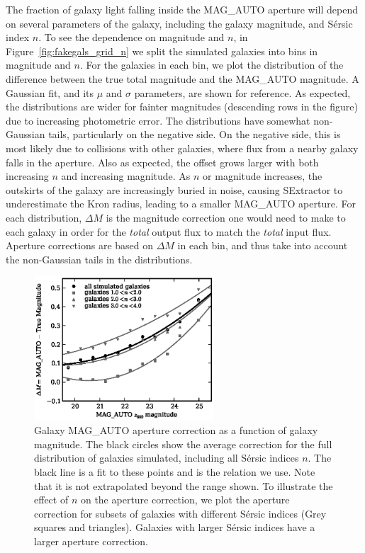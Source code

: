 The fraction of galaxy light falling inside the MAG\_AUTO aperture
will depend on several parameters of the galaxy, including the galaxy
magnitude, and S{\'e}rsic index $n$. To see the dependence on
magnitude and $n$, in Figure~\ref{fig:fakegals_grid_n} we split the
simulated galaxies into bins in magnitude and $n$. For the galaxies in
each bin, we plot the distribution of the difference between the true
total magnitude and the MAG\_AUTO magnitude.  A Gaussian fit, and its
$\mu$ and $\sigma$ parameters, are shown for reference. As expected,
the distributions are wider for fainter magnitudes (descending rows in
the figure) due to increasing photometric error. The distributions
have somewhat non-Gaussian tails, particularly on the negative side. On
the negative side, this is most likely due to collisions with other
galaxies, where flux from a nearby galaxy falls in the aperture. Also
as expected, the offset grows larger with both increasing $n$ and
increasing magnitude. As $n$ or magnitude increases, the outskirts of
the galaxy are increasingly buried in noise, causing {\sc SExtractor}
to underestimate the Kron radius, leading to a smaller MAG\_AUTO
aperture.  For each distribution, $\Delta M$ is the magnitude
correction one would need to make to each galaxy in order for
the \emph{total} output flux to match the \emph{total} input
flux. Aperture corrections are based on $\Delta M$ in each bin, and
thus take into account the non-Gaussian tails in the distributions.


\begin{figure}
\includegraphics[width=0.6\textwidth]{figures/clrate/fakegals_apcorr.eps}
\caption[Aperture correction as a function of magnitude]{Galaxy 
MAG\_AUTO aperture correction as a function of galaxy magnitude. The
black circles show the average correction for the full distribution of
galaxies simulated, including all S{\'e}rsic indices $n$. The black
line is a fit to these points and is the relation we use. Note that it
is not extrapolated beyond the range shown. To illustrate the effect
of $n$ on the aperture correction, we plot the aperture correction for
subsets of galaxies with different S{\'e}rsic indices (Grey
squares and triangles). Galaxies with larger S{\'e}rsic indices have
a larger aperture correction.
\label{fig:fakegals_apcorr}}
\end{figure}

